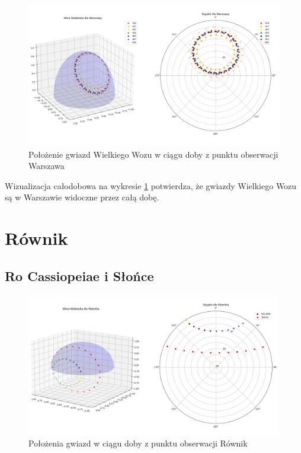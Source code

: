 \documentclass[fleqn,10pt,a4paper]{article}
\begin{document}
\begin{figure}[h!]
  \centering
  \includegraphics[width=1\textwidth]{zdjecia/wielkiwoz_wwa.png}
  \caption{Położenie gwiazd Wielkiego Wozu w ciągu doby z punktu obserwacji Warszawa}
  \label{wielkiwoz_wwa}
\end{figure}


Wizualizacja całodobowa na wykresie \ref{wielkiwoz_wwa} potwierdza, że gwiazdy Wielkiego Wozu są w Warszawie widoczne przez całą dobę.

\section{Równik}
\subsection{Ro Cassiopeiae i Słońce}

\begin{figure}[h!]
    \centering
    \includegraphics[width=0.99\textwidth]{zdjecia/fig1_r.png}
    \caption{Położenia gwiazd w ciągu doby z punktu obserwacji Równik}
    \label{all_r}
\end{figure}
\end{document}
